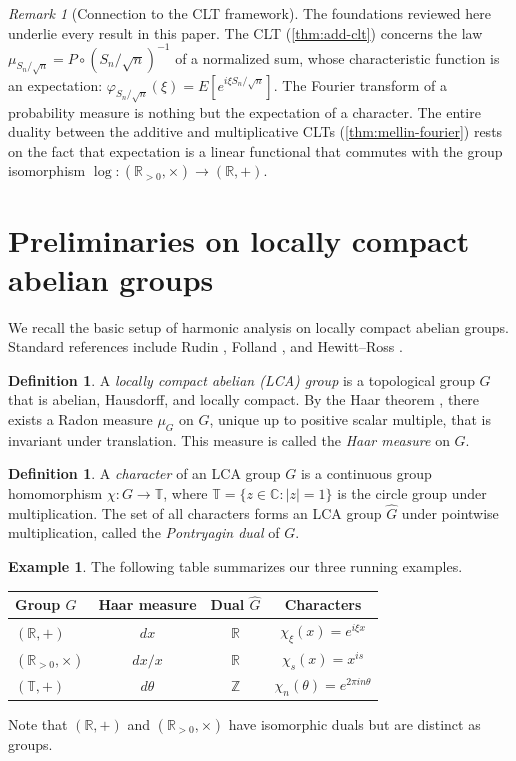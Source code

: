 \documentclass[12pt]{amsart}
\theoremstyle{definition}
\newtheorem{definition}[theorem]{Definition}
\newtheorem{example}[theorem]{Example}
\theoremstyle{remark}
\newtheorem*{remark}{Remark}
\newcommand{\R}{\mathbb{R}}
\newcommand{\Rpos}{\mathbb{R}_{>0}}
\newcommand{\bT}{\mathbb{T}}
\newcommand{\Z}{\mathbb{Z}}
\begin{document}
\begin{remark}[Connection to the CLT framework]
The foundations reviewed here underlie every result in this paper. The CLT (\cref{thm:add-clt}) concerns the law $\mu_{S_n/\sqrt{n}} = P \circ (S_n/\sqrt{n})^{-1}$ of a normalized sum, whose characteristic function is an expectation: $\varphi_{S_n/\sqrt{n}}(\xi) = E[e^{i\xi S_n/\sqrt{n}}]$. The Fourier transform of a probability measure is nothing but the expectation of a character. The entire duality between the additive and multiplicative CLTs (\cref{thm:mellin-fourier}) rests on the fact that expectation is a linear functional that commutes with the group isomorphism $\log : (\Rpos, \times) \to (\R, +)$.
\end{remark}

\section{Preliminaries on locally compact abelian groups}

We recall the basic setup of harmonic analysis on locally compact abelian groups. Standard references include Rudin \cite{Rudin}, Folland \cite{Folland}, and Hewitt--Ross \cite{HewittRoss}.

\begin{definition}\label{def:LCA}
A \emph{locally compact abelian (LCA) group} is a topological group $G$ that is abelian, Hausdorff, and locally compact. By the Haar theorem \cite[Theorem~2.10]{Folland}, there exists a Radon measure $\mu_G$ on $G$, unique up to positive scalar multiple, that is invariant under translation. This measure is called the \emph{Haar measure} on $G$.
\end{definition}

\begin{definition}\label{def:dual}
A \emph{character} of an LCA group $G$ is a continuous group homomorphism $\chi : G \to \bT$, where $\bT = \{z \in \mathbb{C} : |z| = 1\}$ is the circle group under multiplication. The set of all characters forms an LCA group $\widehat{G}$ under pointwise multiplication, called the \emph{Pontryagin dual} of $G$.
\end{definition}

\begin{example}\label{ex:groups}
The following table summarizes our three running examples.
\begin{center}
\renewcommand{\arraystretch}{1.4}
\begin{tabular}{lccc}
\textbf{Group $G$} & \textbf{Haar measure} & \textbf{Dual $\widehat{G}$} & \textbf{Characters} \\
\hline
$(\R, +)$ & $dx$ & $\R$ & $\chi_\xi(x) = e^{i\xi x}$ \\
$(\Rpos, \times)$ & $dx/x$ & $\R$ & $\chi_s(x) = x^{is}$ \\
$(\bT, +)$ & $d\theta$ & $\Z$ & $\chi_n(\theta) = e^{2\pi i n\theta}$
\end{tabular}
\end{center}
Note that $(\R, +)$ and $(\Rpos, \times)$ have isomorphic duals but are distinct as groups.
\end{example}
\end{document}
